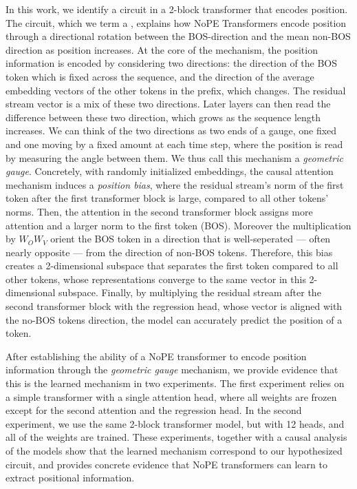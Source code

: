 \documentclass{article}
\theoremstyle{plain}
\theoremstyle{definition}
\theoremstyle{remark}
\begin{document}
In this work, we identify a circuit \citep{elhage2021mathematical} in a 2-block transformer that encodes position. The circuit, which we term
a , explains how NoPE Transformers encode position through a directional rotation between the BOS-direction and the mean non-BOS direction as position increases.
At the core of the mechanism, the position information is encoded by considering two directions: the direction of the BOS token which is fixed across the sequence, and the direction of the average embedding vectors of the other tokens in the prefix, which changes. The residual stream vector is a mix of these two directions. Later layers can then read the difference between these two direction, which grows as the sequence length increases.
We can think of the two directions as two ends of a gauge, one fixed and one moving by a fixed amount at each time step, where the position is read by measuring the angle between them. We thus call this mechanism a \emph{geometric gauge}.
Concretely, with randomly initialized embeddings, the causal attention mechanism induces a \textit{position bias}, where the residual stream's norm of the first token after the first transformer block is large, compared to all other tokens' norms. Then, the attention in the second transformer block assigns more attention and a larger norm to the first token (BOS). Moreover the multiplication by $W_OW_V$ orient the BOS token in a direction that is well-seperated --- often nearly opposite --- from the direction of non-BOS tokens. Therefore, this bias creates a 2-dimensional subspace that separates the first token compared to all other tokens, whose representations converge to the same vector in this 2-dimensional subspace. Finally, by multiplying the residual stream after the second transformer block with the regression head, whose vector is aligned with the no-BOS tokens direction, the model can accurately predict the position of a token.

After establishing the ability of a NoPE transformer to encode position information through the \textit{geometric gauge} mechanism, we provide evidence that this is the learned mechanism in two experiments. The first experiment relies on a simple transformer with a single attention head, where all weights are frozen except for the second attention and the regression head. In the second experiment, we use the same 2-block transformer model, but with 12 heads, and all of the weights are trained. These experiments, together with a causal analysis of the models show that the learned mechanism correspond to our hypothesized circuit, and provides concrete evidence that NoPE transformers can learn to extract positional information.
\end{document}
